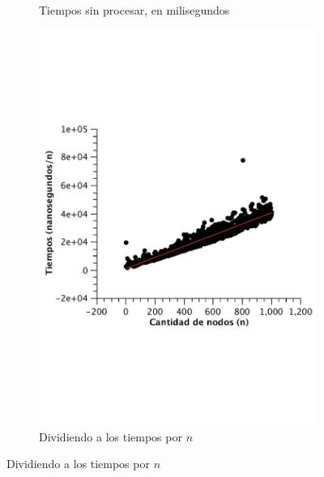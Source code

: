 \begin{figure}[H]
\begin{subfigure}[b]{0.45\textwidth}
                \caption{Tiempos sin procesar, en milisegundos}
        \end{subfigure}%
        \begin{subfigure}[b]{0.45\textwidth}
                \includegraphics[width=\textwidth]{imagenes/vacio-matriz-2.pdf}
                \caption{Dividiendo a los tiempos por $n$}
        \end{subfigure}

\end{figure}

